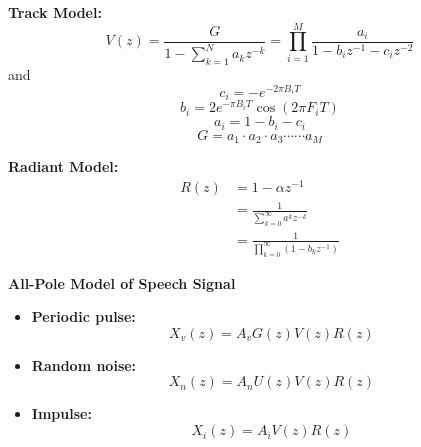 \documentclass[10pt,a4paper,oneside]{beamer}
\begin{document}
\begin{frame}
\vspace{0.5cm}
{\bfseries Track Model:} 
\vspace{0.3cm}
\[
V(z)=\frac{G}{1-\sum_{k=1}^{N} a_{k} z^{-k}}=\prod_{i=1}^{M} \frac{a_{i}}{1-b_{i} z^{-1}-c_{i} z^{-2}}
\]
and
\[
c_{i}=-e^{-2 \pi B_{i} T}
\]
\[
b_{i}=2 e^{-\pi B_{i} T} \cos \left(2 \pi F_{i} T\right)
\]
\[
a_{i}=1-b_{i}-c_{i}
\]
\[
G=a_{1} \cdot a_{2} \cdot a_{3} \cdots \cdots a_{M}
\]
\end{frame}
\begin{frame}
\vspace{0.5cm}
{\bfseries Radiant Model:} 
\vspace{0.5cm}
\[
\begin{aligned} R(z) &= 1 - \alpha z^{-1} \\&=\frac{1}{\sum_{k=0}^{\infty} a^{k} z^{-k}} \\ &=\frac{1}{\prod_{k=0}^{\infty}\left(1-b_{k} z^{-1}\right)} \end{aligned}
\]
\end{frame}
\begin{frame}
\vspace{0.5cm}
{\bfseries All-Pole Model of Speech Signal} 
\begin{itemize}
	\item  {\bfseries Periodic pulse:} 
	\[
	X_v(z) = A_vG(z)V(z)R(z)
	\]
	\item {\bfseries Random noise:} 
	\[
	X_n(z) = A_nU(z)V(z)R(z)
	\]
	\item {\bfseries Impulse:} 
	\[
	X_i(z)=A_iV(z)R(z)
	\]
\end{itemize}
\end{frame}
\end{document}

